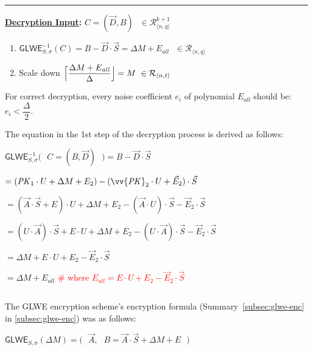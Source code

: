 \begin{tcolorbox}[title={\textbf{\tboxlabel{\ref*{subsec:glwe-enc}} GLWE Public Key Encryption}}]
\begin{enumerate}
\end{enumerate}


\par\noindent\rule{\textwidth}{0.4pt}

\textbf{\underline{Decryption Input}:} $C = (\vec{D}, B) \text{ } \in \mathcal{R}_{\langle n,q \rangle}^{k + 1}$

\begin{enumerate}
\item $\textsf{GLWE}^{-1}_{S,\sigma}(C) = B - \vec{D} \cdot \vec{S} = \Delta  M + E_{\mathit{all}} \text{ } \in \mathcal{R}_{\langle n,q \rangle}$

\item Scale down 
$\Bigl\lceil \dfrac{ \Delta  M + E_{\mathit{all}} }{\Delta}\Bigr\rfloor = M  \text{ } \in \mathcal{R}_{\langle n, t \rangle}$

\end{enumerate}

For correct decryption, every noise coefficient $e_i$ of polynomial $E_{\mathit{all}}$ should be: $e_i < \dfrac{\Delta}{2}$.

\end{tcolorbox}


The equation in the 1st step of the decryption process is derived as follows:

$\textsf{GLWE}^{-1}_{S,\sigma}\bm{(}\text{ } C = (B, \vec{D}) \text{ }\bm{)} = B - \vec{D}\cdot\vec{S}$

$ = (\mathit{PK}_1\cdot U + \Delta  M + E_2) - (\vv{\mathit{PK}}_2 \cdot U + \vec{E}_2)\cdot \vec{S} $

$=  (\vec{A} \cdot \vec{S} + E)\cdot U + \Delta M + E_2 - (\vec{A}\cdot U)\cdot \vec{S} - \vec{E}_2\cdot\vec{S}$

$=  (U\cdot\vec{A}) \cdot \vec{S} + E \cdot U + \Delta M + E_2 - (U\cdot \vec{A}) \cdot \vec{S} - \vec{E}_2\cdot\vec{S}$

$= \Delta M + E \cdot U + E_2 - \vec{E}_2\cdot\vec{S}$

$= \Delta M + E_{\mathit{all}}$ \textcolor{red}{\text{ } \# where $E_{\mathit{all}} = E \cdot U + E_2 - \vec{E}_2\cdot\vec{S}$} 


$ $

 The GLWE encryption scheme's encryption formula (Summary~\ref{subsec:glwe-enc} in \autoref{subsec:glwe-enc}) was as follows: 

$\textsf{GLWE}_{S, \sigma}(\Delta M) = \bm{(} \text{ } \vec{A}, \text{ } B = \vec{A}\cdot\vec{S} + \Delta M + E \text{ }\bm{)}$


